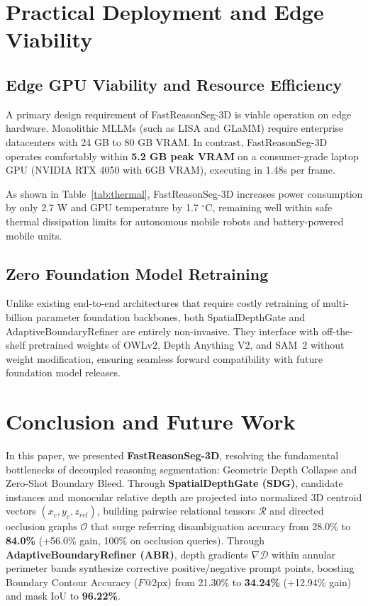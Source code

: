 \documentclass[10pt,twocolumn,letterpaper]{article}
\begin{document}
\section{Practical Deployment and Edge Viability}
\label{sec:deployment}

\subsection{Edge GPU Viability and Resource Efficiency}
A primary design requirement of FastReasonSeg-3D is viable operation on edge hardware. Monolithic MLLMs (such as LISA and GLaMM) require enterprise datacenters with 24 GB to 80 GB VRAM. In contrast, FastReasonSeg-3D operates comfortably within \textbf{5.2 GB peak VRAM} on a consumer-grade laptop GPU (NVIDIA RTX 4050 with 6GB VRAM), executing in 1.48s per frame.

As shown in Table~\ref{tab:thermal}, FastReasonSeg-3D increases power consumption by only 2.7 W and GPU temperature by 1.7 $^\circ$C, remaining well within safe thermal dissipation limits for autonomous mobile robots and battery-powered mobile units.

\subsection{Zero Foundation Model Retraining}
Unlike existing end-to-end architectures that require costly retraining of multi-billion parameter foundation backbones, both SpatialDepthGate and AdaptiveBoundaryRefiner are entirely non-invasive. They interface with off-the-shelf pretrained weights of OWLv2, Depth Anything V2, and SAM~2 without weight modification, ensuring seamless forward compatibility with future foundation model releases.

\clearpage
\section{Conclusion and Future Work}
\label{sec:conclusion}

In this paper, we presented \textbf{FastReasonSeg-3D}, resolving the fundamental bottlenecks of decoupled reasoning segmentation: Geometric Depth Collapse and Zero-Shot Boundary Bleed. Through \textbf{SpatialDepthGate (SDG)}, candidate instances and monocular relative depth are projected into normalized 3D centroid vectors $(x_c, y_c, z_{rel})$, building pairwise relational tensors $\mathcal{R}$ and directed occlusion graphs $\mathcal{O}$ that surge referring disambiguation accuracy from 28.0\% to \textbf{84.0\%} (+56.0\% gain, 100\% on occlusion queries). Through \textbf{AdaptiveBoundaryRefiner (ABR)}, depth gradients $\nabla \mathcal{D}$ within annular perimeter bands synthesize corrective positive/negative prompt points, boosting Boundary Contour Accuracy ($F@2\text{px}$) from 21.30\% to \textbf{34.24\%} (+12.94\% gain) and mask IoU to \textbf{96.22\%}.
\end{document}
